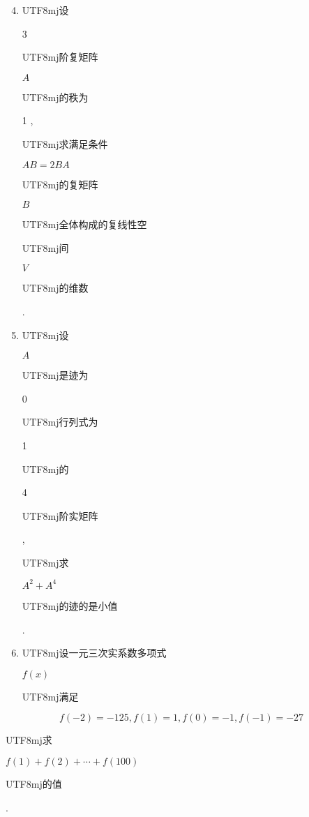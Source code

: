 \documentclass[10pt]{article}
\begin{document}
\begin{enumerate}
  \setcounter{enumi}{3}
  \item \begin{CJK}{UTF8}{mj}设\end{CJK} 3 \begin{CJK}{UTF8}{mj}阶复矩阵\end{CJK} $A$ \begin{CJK}{UTF8}{mj}的秩为\end{CJK} 1 , \begin{CJK}{UTF8}{mj}求满足条件\end{CJK} $A B=2 B A$ \begin{CJK}{UTF8}{mj}的复矩阵\end{CJK} $B$ \begin{CJK}{UTF8}{mj}全体构成的复线性空\end{CJK} \begin{CJK}{UTF8}{mj}间\end{CJK} $V$ \begin{CJK}{UTF8}{mj}的维数\end{CJK}.

  \item \begin{CJK}{UTF8}{mj}设\end{CJK} $A$ \begin{CJK}{UTF8}{mj}是迹为\end{CJK} 0 \begin{CJK}{UTF8}{mj}行列式为\end{CJK} 1 \begin{CJK}{UTF8}{mj}的\end{CJK} 4 \begin{CJK}{UTF8}{mj}阶实矩阵\end{CJK}, \begin{CJK}{UTF8}{mj}求\end{CJK} $A^{2}+A^{4}$ \begin{CJK}{UTF8}{mj}的迹的是小值\end{CJK}.

  \item \begin{CJK}{UTF8}{mj}设一元三次实系数多项式\end{CJK} $f(x)$ \begin{CJK}{UTF8}{mj}满足\end{CJK}

\end{enumerate}
$$
f(-2)=-125, f(1)=1, f(0)=-1, f(-1)=-27
$$
\begin{CJK}{UTF8}{mj}求\end{CJK} $f(1)+f(2)+\cdots+f(100)$ \begin{CJK}{UTF8}{mj}的值\end{CJK}.
\end{document}
